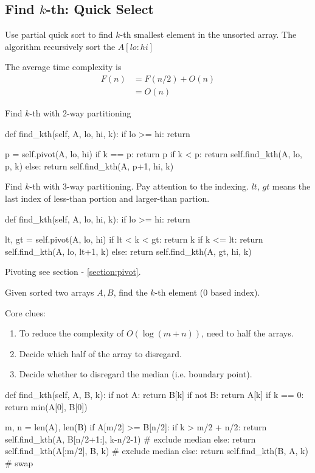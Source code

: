 \subsection{Find $k$-th: Quick Select}
Use partial quick sort to find $k$-th smallest element in the unsorted array. The algorithm recursively sort the $A[lo:hi]$

The average time complexity is
\begin{align*}
F(n) &= F(n/2) + O(n) \\
&= O(n)
\end{align*}

Find $k$-th with 2-way partitioning
\begin{python}
def find_kth(self, A, lo, hi, k):
    if lo >= hi: return
    
    p = self.pivot(A, lo, hi)
    if k == p: return p
    if k < p:  return self.find_kth(A, lo, p, k)
    else:      return self.find_kth(A, p+1, hi, k)
\end{python}
Find $k$-th with 3-way partitioning. Pay attention to the indexing. $lt$, $gt$ means the last index of less-than portion and larger-than partion. 
\begin{python}
def find_kth(self, A, lo, hi, k):
    if lo >= hi: return

    lt, gt = self.pivot(A, lo, hi)
    if lt < k < gt: return k
    if k <= lt: return self.find_kth(A, lo, lt+1, k)
    else:       return self.find_kth(A, gt, hi, k)
\end{python}

Pivoting see section - \ref{section:pivot}.

 Given sorted two arrays $A, B$, find the $k$-th element (0 based index).

Core clues:
\begin{enumerate}
\item To reduce the complexity of $O(\log (m+n))$, need to half the arrays.
\item Decide which half of the array to disregard. 
\item Decide whether to disregard the median (i.e. boundary point).
\end{enumerate}
\begin{python}
def find_kth(self, A, B, k):
  if not A:  return B[k]
  if not B:  return A[k]
  if k == 0: return min(A[0], B[0])

  m, n = len(A), len(B)
  if A[m/2] >= B[n/2]:
    if k > m/2 + n/2:
      return self.find_kth(A, B[n/2+1:], k-n/2-1)  # exclude median
    else:
      return self.find_kth(A[:m/2], B, k)  # exclude median
  else:
    return self.find_kth(B, A, k)  # swap
\end{python}
